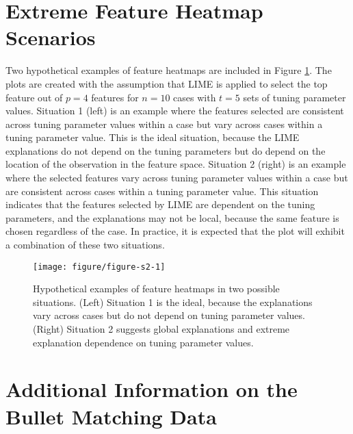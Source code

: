 \documentclass{article}\usepackage[]{graphicx}\usepackage[]{color}
\newenvironment{knitrout}{}{} %
\begin{document}
\section{Extreme Feature Heatmap Scenarios}

Two hypothetical examples of feature heatmaps are included in Figure \ref{fig:figure-s2}. The plots are created with the assumption that LIME is applied to select the top feature out of $p=4$  features for $n=10$ cases with $t=5$ sets of tuning parameter values. Situation 1 (left) is an example where the features selected are consistent across tuning parameter values within a case but vary across cases within a tuning parameter value. This is the ideal situation, because the LIME explanations do not depend on the tuning parameters but do depend on the location of the observation in the feature space. Situation 2 (right) is an example where the selected features vary across tuning parameter values within a case but are consistent across cases within a tuning parameter value. This situation indicates that the features selected by LIME are dependent on the tuning parameters, and the explanations may not be  local, because the same feature is chosen regardless of the case. In practice, it is expected that the plot will exhibit a combination of these two situations.

\vspace{0.5cm}

\renewcommand{\thefigure}{S2}
\begin{figure}[!h]
\begin{knitrout}
\color{fgcolor}

{\centering \texttt{[image: figure/figure-s2-1]} 

}



\end{knitrout}
\caption{Hypothetical examples of feature heatmaps in two possible situations. (Left) Situation 1 is the ideal, because the explanations vary across cases but do not depend on tuning parameter values. (Right) Situation 2 suggests global explanations and extreme explanation dependence on tuning parameter values.}
\label{fig:figure-s2}
\end{figure}

\section{Additional Information on the Bullet Matching Data}
\end{document}
